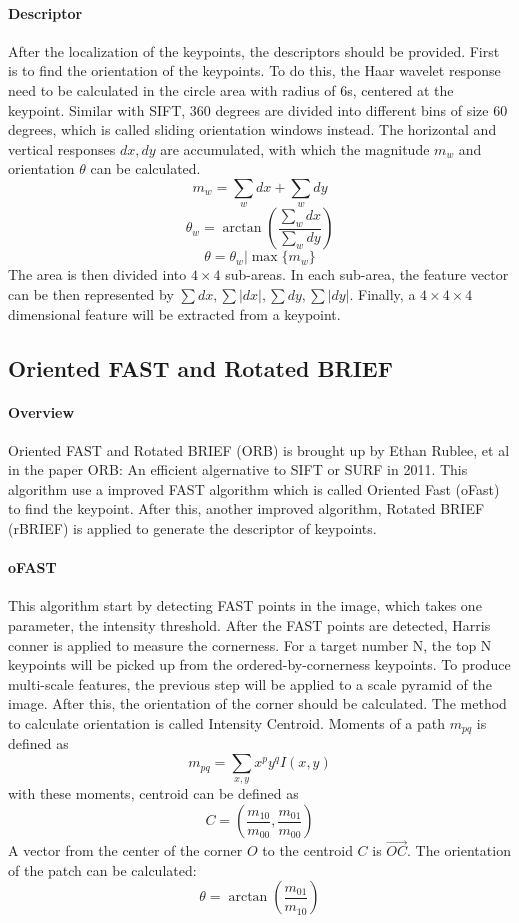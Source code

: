 \documentclass[paper=a4, fontsize=11pt]{scrartcl} %
\numberwithin{equation}{section} %
\numberwithin{figure}{section} %
\numberwithin{table}{section} %
\begin{document}
\paragraph{Descriptor}
After the localization of the keypoints, the descriptors should be provided. First is to find the orientation of the keypoints. 
To do this, the Haar wavelet response need to be calculated in the circle area with radius of 6s, centered at the keypoint. 
Similar with SIFT, 360 degrees are divided into different bins of size 60 degrees, which is called sliding orientation windows instead.
The horizontal and vertical responses $dx, dy$ are accumulated, with which the magnitude $m_w$ and orientation $\theta$ can be calculated.
$$
m_w = \sum_w dx + \sum_w dy
$$
$$
\theta_w = \arctan(\frac{\sum_w dx}{\sum_w dy})
$$
$$
\theta = \theta_w | \max{\{m_w\}}
$$
The area is then divided into $4\times4$ sub-areas.
In each sub-area, the feature vector can be then represented by $\sum dx, \sum|dx|, \sum dy, \sum |dy|$.
Finally, a $4\times4\times4$ dimensional feature will be extracted from a keypoint.



\subsection{Oriented FAST and Rotated BRIEF}

\paragraph{Overview}
Oriented FAST and Rotated BRIEF (ORB) is brought up by Ethan Rublee, et al in the paper ORB: An efficient algernative to SIFT or SURF in 2011.
This algorithm use a improved FAST algorithm which is called Oriented Fast (oFast) to find the keypoint. 
After this, another improved algorithm, Rotated BRIEF (rBRIEF) is applied to generate the descriptor of keypoints.

\paragraph{oFAST}
This algorithm start by detecting FAST points in the image, which takes one parameter, the intensity threshold. 
After the FAST points are detected, Harris conner is applied to measure the cornerness. 
For a target number N, the top N keypoints will be picked up from the ordered-by-cornerness keypoints.
To produce multi-scale features, the previous step will be applied to a scale pyramid of the image.
After this, the orientation of the corner should be calculated.
The method to calculate orientation is called Intensity Centroid.
Moments of a path $m_{pq}$ is defined as
$$
m_{pq} = \sum_{x, y} x^p y^q I(x, y)
$$
with these moments, centroid can be defined as
$$
C = \left( \frac{m_{10}} {m_{00} }, \frac{m_{01}} {m_{00}} \right)
$$
A vector from the center of the corner $O$ to the centroid $C$ is $\overrightarrow{OC}$. 
The orientation of the patch can be calculated:
$$
\theta = \arctan(\frac{m_{01}}{m_{10}})
$$
\end{document}
